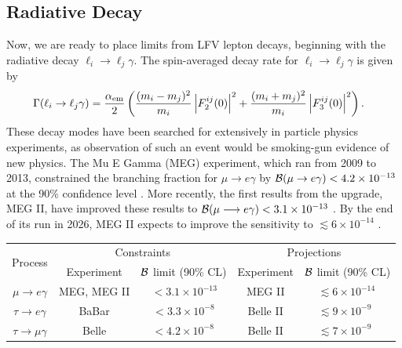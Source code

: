 {\subsection{Radiative Decay}\label{sec:radiative}
Now, we are ready to place limits from LFV lepton decays, beginning with the radiative decay $\ell_i \rightarrow \ell_j\gamma$. The spin-averaged decay rate for $\ell_i \rightarrow \ell_j\gamma$ is given by
\begin{align}
    \Gamma(\ell_i\rightarrow\ell_j\gamma) &= \frac{\alpha_{\rm em}}{2}\left(\frac{(m_i - m_j)^2}{ m_i}\left|F_2^{ij}(0)\right|^2 + \frac{(m_i + m_j)^2}{ m_i}\left|F_3^{ij}(0)\right|^2\right).
\end{align}
These decay modes have been searched for extensively in particle physics experiments, as observation of such an event would be smoking-gun evidence of new physics. The Mu E Gamma (MEG) experiment, which ran from 2009 to 2013, constrained the branching fraction for $\mu \rightarrow e\gamma$ by ${\cal B}(\mu \rightarrow e\gamma) < 4.2\times 10^{-13}$ at the 90\% confidence level \cite{Mori:2016vwi}. More recently, the first results from the upgrade, MEG II, have improved these results to ${\cal B}(\mu \longrightarrow e\gamma) < 3.1 \times 10^{-13}$ \cite{MEGII:2023ltw}. By the end of its run in 2026, MEG II expects to improve the sensitivity to $\lesssim 6\times 10^{-14}$ \cite{MEGII:2018kmf}.
\begin{table}[t!]
\centering
\begin{tabular}{|c|cc|cc|}
\hline
\multirow{2}{*}{\rule{0pt}{2.5ex}Process}   & \multicolumn{2}{c|}{Constraints}                                 & \multicolumn{2}{c|}{Projections}                                 \\ \cline{2-5} 
                           & \multicolumn{1}{c|}{Experiment} & ${\cal B}$ limit (90\% CL) & \multicolumn{1}{c|}{Experiment} & ${\cal B}$ limit (90\% CL) \\ \hline
\rule{0pt}{2.5ex}$\mu \rightarrow e\gamma$   & \multicolumn{1}{c|}{MEG, MEG II} & $~~<3.1\times10^{-13}$\cite{MEGII:2023ltw}\,\, & \multicolumn{1}{c|}{MEG II} & $\,\,\lesssim 6\times10^{-14}$\cite{MEGII:2018kmf}\,\,\,\\
$\tau\rightarrow e\gamma$  & \multicolumn{1}{c|}{BaBar} & $<3.3\times10^{-8}$\cite{BaBar:2010axs} & \multicolumn{1}{c|}{Belle II} & $\lesssim 9\times10^{-9}$\cite{Belle-II:2018jsg}\,\,\,\\
$\tau\rightarrow\mu\gamma$ & \multicolumn{1}{c|}{Belle} & $~\,<4.2\times10^{-8}$ \cite{Belle:2021ysv}\,& \multicolumn{1}{c|}{Belle II} & $\lesssim 7\times10^{-9}$\cite{Belle-II:2018jsg} \,\\

\end{tabular}
\end{table}}
